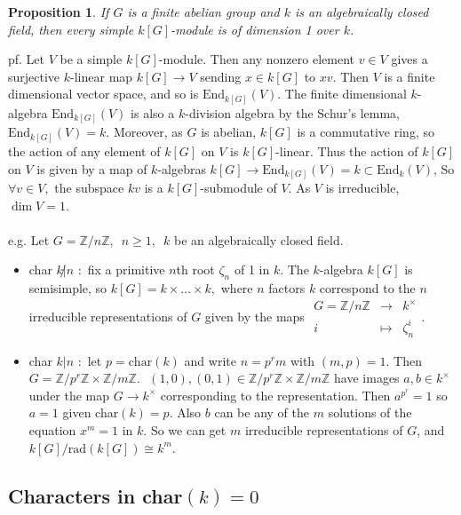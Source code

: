 \documentclass[12pt,letterpaper]{report}
\newtheorem{proposition}{Proposition}[section]
\begin{document}
\begin{proposition}If $G$ is a finite abelian group and $k$ is an algebraically closed field, then every simple $k[G]$-module is of dimension 1 over $k$.\end{proposition}
pf. Let $V$ be a simple $k[G]$-module. Then any nonzero element $v\in V$ gives a surjective $k$-linear map $k[G]\rightarrow V$ sending $x\in k[G]$ to $xv$. Then $V$ is a finite dimensional vector space, and so is $\text{End}_{k[G]}(V)$. The finite dimensional $k$-algebra $\text{End}_{k[G]}(V)$ is also a $k$-division algebra by the Schur's lemma, $\text{End}_{k[G]}(V)=k$. Moreover, as $G$ is abelian, $k[G]$ is a commutative ring, so the action of any element of $k[G]$ on $V$ is $k[G]$-linear. Thus the action of $k[G]$ on $V$ is given by a map of $k$-algebras $k[G]\rightarrow\text{End}_{k[G]}(V)=k\subset\text{End}_{k}(V)$, So $\forall v\in V,$ the subspace $kv$ is a $k[G]$-submodule of $V$. As $V$ is irreducible, $\dim V=1$. 
\\\\e.g. Let $G=\mathbb{Z}/n\mathbb{Z},\,\,\,n\geq1,\,\,\,k$ be an algebraically closed field.\begin{itemize}\item char $k\not|n\,\,:$ fix a primitive $n$th root $\zeta_{n}$ of 1 in $k$. The $k$-algebra $k[G]$ is semisimple, so $k[G]=k\times\dots\times k,$ where $n$ factors $k$ correspond to the $n$ irreducible representations of $G$ given by the maps $\begin{array}{rrr}G=\mathbb{Z}/n\mathbb{Z}&\rightarrow&k^{\times}\\i&\mapsto&\zeta_{n}^{i}\end{array}$.
\item char $k|n\,\,:$ let $p=\text{char}(k)$ and write $n=p^{r}m$ with $(m,p)=1$. Then $G=\mathbb{Z}/p^{r}\mathbb{Z}\times\mathbb{Z}/m\mathbb{Z}.\,\,\,\,(1,0),(0,1)\in\mathbb{Z}/p^{r}\mathbb{Z}\times\mathbb{Z}/m\mathbb{Z}$ have images $a,b\in k^{\times}$ under the map $G\rightarrow k^{\times}$ corresponding to the representation. Then $a^{p^{r}}=1$ so $a=1$ given char$(k)=p$. Also $b$ can be any of the $m$ solutions of the equation $x^{m}=1$ in $k$. So we can get $m$ irreducible representations of $G$, and $k[G]/\text{rad}(k[G])\cong k^{m}$. \end{itemize}



\subsection{Characters in char$(k)=0$}
\end{document}
